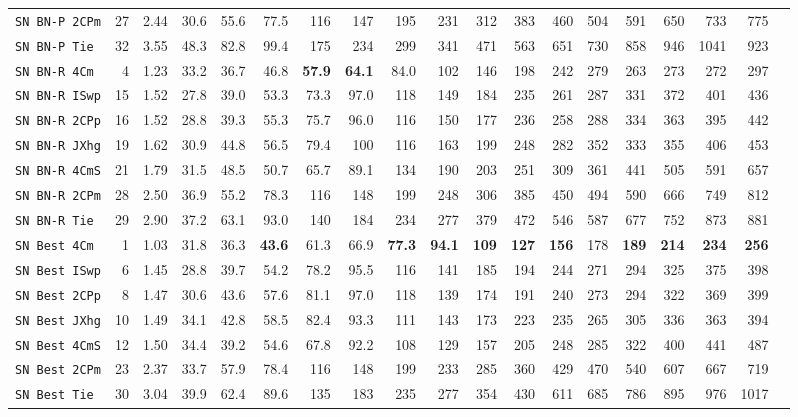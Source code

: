 \begin{tabular}{l | r @{~~} r | r@{~~}r@{~~}r@{~~}r@{~~}r@{~~}r@{~~}r@{~~}r@{~~}r@{~~}r@{~~}r@{~~}r@{~~}r@{~~}r@{~~}r@{~~}r|}
\verb+SN BN-P 2CPm+ & 27 & 2.44 & 30.6&55.6&77.5&116&147&195&231&312&383&460&504&591&650&733&775\\
\verb+SN BN-P Tie + & 32 & 3.55 & 48.3&82.8&99.4&175&234&299&341&471&563&651&730&858&946&1041&923\smallskip \\
\verb+SN BN-R 4Cm + & 4 & 1.23 & 33.2&36.7&46.8&\textbf{57.9}&\textbf{64.1}&84.0&102&146&198&242&279&263&273&272&297\\
\verb+SN BN-R ISwp+ & 15 & 1.52 & 27.8&39.0&53.3&73.3&97.0&118&149&184&235&261&287&331&372&401&436\\
\verb+SN BN-R 2CPp+ & 16 & 1.52 & 28.8&39.3&55.3&75.7&96.0&116&150&177&236&258&288&334&363&395&442\\
\verb+SN BN-R JXhg+ & 19 & 1.62 & 30.9&44.8&56.5&79.4&100&116&163&199&248&282&352&333&355&406&453\\
\verb+SN BN-R 4CmS+ & 21 & 1.79 & 31.5&48.5&50.7&65.7&89.1&134&190&203&251&309&361&441&505&591&657\\
\verb+SN BN-R 2CPm+ & 28 & 2.50 & 36.9&55.2&78.3&116&148&199&248&306&385&450&494&590&666&749&812\\
\verb+SN BN-R Tie + & 29 & 2.90 & 37.2&63.1&93.0&140&184&234&277&379&472&546&587&677&752&873&881\smallskip \\
\verb+SN Best 4Cm + & 1 & 1.03 & 31.8&36.3&\textbf{43.6}&61.3&66.9&\textbf{77.3}&\textbf{94.1}&\textbf{109}&\textbf{127}&\textbf{156}&178&\textbf{189}&\textbf{214}&\textbf{234}&\textbf{256}\\
\verb+SN Best ISwp+ & 6 & 1.45 & 28.8&39.7&54.2&78.2&95.5&116&141&185&194&244&271&294&325&375&398\\
\verb+SN Best 2CPp+ & 8 & 1.47 & 30.6&43.6&57.6&81.1&97.0&118&139&174&191&240&273&294&322&369&399\\
\verb+SN Best JXhg+ & 10 & 1.49 & 34.1&42.8&58.5&82.4&93.3&111&143&173&223&235&265&305&336&363&394\\
\verb+SN Best 4CmS+ & 12 & 1.50 & 34.4&39.2&54.6&67.8&92.2&108&129&157&205&248&285&322&400&441&487\\
\verb+SN Best 2CPm+ & 23 & 2.37 & 33.7&57.9&78.4&116&148&199&233&285&360&429&470&540&607&667&719\\
\verb+SN Best Tie + & 30 & 3.04 & 39.9&62.4&89.6&135&183&235&277&354&430&611&685&786&895&976&1017\\
\end{tabular}
